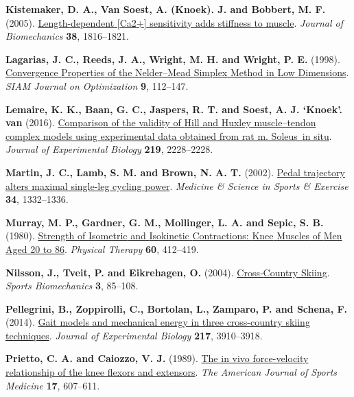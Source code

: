 \documentclass[
  11pt,
  a4paper]{article}
\newlength{\cslhangindent}
\newenvironment{CSLReferences}[2] %
 {\begin{list}{}{%
  \setlength{\itemindent}{0pt}
  \setlength{\leftmargin}{0pt}
  \setlength{\parsep}{0pt}
  \ifodd #1
   \setlength{\leftmargin}{\cslhangindent}
   \setlength{\itemindent}{-1\cslhangindent}
  \fi
  \setlength{\itemsep}{#2\baselineskip}}}
 {\end{list}}
\begin{document}
\begin{CSLReferences}{1}{1}
\textbf{Kistemaker, D. A., Van Soest, A. (Knoek). J. and Bobbert, M. F.}
(2005).
\href{https://doi.org/10.1016/j.jbiomech.2004.08.025}{Length-dependent
{[}{Ca2}+{]} sensitivity adds stiffness to muscle}. \emph{Journal of
Biomechanics} \textbf{38}, 1816--1821.

\textbf{Lagarias, J. C., Reeds, J. A., Wright, M. H. and Wright, P. E.}
(1998). \href{https://doi.org/10.1137/S1052623496303470}{Convergence
{Properties} of the {Nelder}--{Mead} {Simplex} {Method} in {Low}
{Dimensions}}. \emph{SIAM Journal on Optimization} \textbf{9}, 112--147.

\textbf{Lemaire, K. K., Baan, G. C., Jaspers, R. T. and Soest, A. J.
`Knoek'. van} (2016).
\href{https://doi.org/10.1242/jeb.144394}{Comparison of the validity of
{Hill} and {Huxley} muscle--tendon complex models using experimental
data obtained from rat m. Soleus~in situ}. \emph{Journal of Experimental
Biology} \textbf{219}, 2228--2228.

\textbf{Martin, J. C., Lamb, S. M. and Brown, N. A. T.} (2002).
\href{https://journals.lww.com/acsm-msse/fulltext/2002/08000/pedal_trajectory_alters_maximal_single_leg_cycling.15.aspx}{Pedal
trajectory alters maximal single-leg cycling power}. \emph{Medicine \&
Science in Sports \& Exercise} \textbf{34}, 1332--1336.

\textbf{Murray, M. P., Gardner, G. M., Mollinger, L. A. and Sepic, S.
B.} (1980). \href{https://doi.org/10.1093/ptj/60.4.412}{Strength of
{Isometric} and {Isokinetic} {Contractions}: {Knee} {Muscles} of {Men}
{Aged} 20 to 86}. \emph{Physical Therapy} \textbf{60}, 412--419.

\textbf{Nilsson, J., Tveit, P. and Eikrehagen, O.} (2004).
\href{https://doi.org/10.1080/14763140408522832}{Cross‐{Country}
{Skiing}}. \emph{Sports Biomechanics} \textbf{3}, 85--108.

\textbf{Pellegrini, B., Zoppirolli, C., Bortolan, L., Zamparo, P. and
Schena, F.} (2014). \href{https://doi.org/10.1242/jeb.106740}{Gait
models and mechanical energy in three cross-country skiing techniques}.
\emph{Journal of Experimental Biology} \textbf{217}, 3910--3918.

\textbf{Prietto, C. A. and Caiozzo, V. J.} (1989).
\href{https://doi.org/10.1177/036354658901700503}{The in vivo
force-velocity relationship of the knee flexors and extensors}.
\emph{The American Journal of Sports Medicine} \textbf{17}, 607--611.


\end{CSLReferences}
\end{document}
